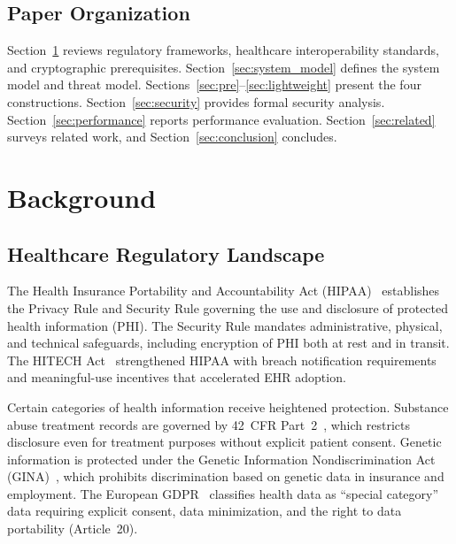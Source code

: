 \documentclass[conference,10pt]{IEEEtran}
\begin{document}
\subsection{Paper Organization}

Section~\ref{sec:background} reviews regulatory frameworks, healthcare interoperability standards, and cryptographic prerequisites. Section~\ref{sec:system_model} defines the system model and threat model. Sections~\ref{sec:pre}--\ref{sec:lightweight} present the four constructions. Section~\ref{sec:security} provides formal security analysis. Section~\ref{sec:performance} reports performance evaluation. Section~\ref{sec:related} surveys related work, and Section~\ref{sec:conclusion} concludes.

\section{Background}
\label{sec:background}

\subsection{Healthcare Regulatory Landscape}

The Health Insurance Portability and Accountability Act (HIPAA)~\cite{hipaa1996} establishes the Privacy Rule and Security Rule governing the use and disclosure of protected health information (PHI). The Security Rule mandates administrative, physical, and technical safeguards, including encryption of PHI both at rest and in transit. The HITECH Act~\cite{hitech2009} strengthened HIPAA with breach notification requirements and meaningful-use incentives that accelerated EHR adoption.

Certain categories of health information receive heightened protection. Substance abuse treatment records are governed by 42~CFR Part~2~\cite{cfr42part2}, which restricts disclosure even for treatment purposes without explicit patient consent. Genetic information is protected under the Genetic Information Nondiscrimination Act (GINA)~\cite{gina2008}, which prohibits discrimination based on genetic data in insurance and employment. The European GDPR~\cite{gdpr2016} classifies health data as ``special category'' data requiring explicit consent, data minimization, and the right to data portability (Article~20).
\end{document}
